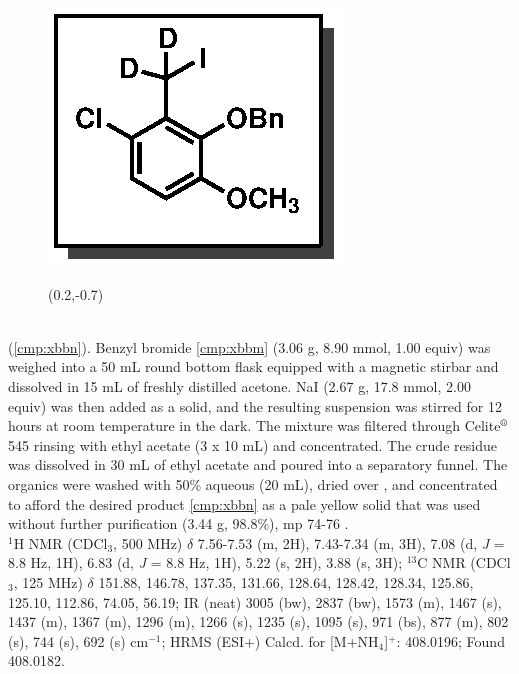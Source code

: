 \vspace{10pt}
\begin{figure}
  \vspace{-25pt}
  \begin{center}
    \includegraphics[scale=0.8]{chp_singlecarbon/images/xbbn}
    \begin{textblock}{1}(0.2,-0.7)  \end{textblock}
  \end{center}
  \vspace{-30pt}
\end{figure}\noindent \textbf{\CMPxbbn}\\ (\ref{cmp:xbbn}). Benzyl bromide \ref{cmp:xbbm} (3.06
g, 8.90 mmol, 1.00 equiv) was weighed into a 50 mL round bottom flask equipped with a magnetic
stirbar and dissolved in 15 mL of freshly distilled acetone. NaI (2.67 g, 17.8 mmol, 2.00
equiv) was then added as a solid, and the resulting suspension was stirred for 12 hours at room
temperature in the dark. The mixture was filtered through Celite$\textsuperscript{\textregistered}$ 545 rinsing with ethyl acetate (3 x 10 mL) and concentrated. The crude residue was dissolved in 30 mL of ethyl acetate and
poured into a separatory funnel. The organics were washed with 50\% aqueous  (20 mL),
dried over , and concentrated to afford the desired product \ref{cmp:xbbn} as a pale
yellow solid that was used without further purification (3.44 g, 98.8\%), mp 74-76 \degc. \\
$^1$H NMR (CDCl$_3$, 500 MHz) $\delta$ 7.56-7.53 (m, 2H), 7.43-7.34 (m, 3H), 7.08 (d, \textit{J} = 8.8 Hz, 1H),
6.83 (d, \textit{J} = 8.8 Hz, 1H), 5.22 (s, 2H), 3.88 (s, 3H);
$^{13}$C NMR (CDCl$_3$, 125 MHz) $\delta$ 151.88,
146.78, 137.35, 131.66, 128.64, 128.42, 128.34, 125.86, 125.10, 112.86, 74.05, 56.19; IR (neat)
3005 (bw), 2837 (bw), 1573 (m), 1467 (s), 1437 (m), 1367 (m), 1296 (m), 1266 (s), 1235 (s),
1095 (s), 971 (bs), 877 (m), 802 (s), 744 (s), 692 (s) cm$^{-1}$; HRMS (ESI+) Calcd. for
 [M+NH$_4$]$^+$: 408.0196; Found 408.0182.


\pagebreak
